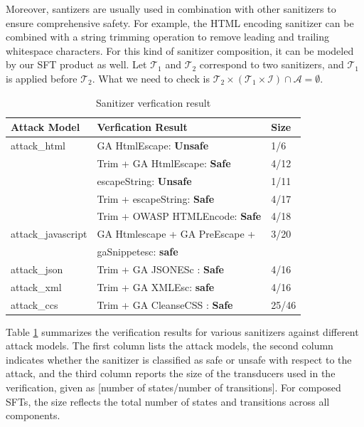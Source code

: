 Moreover, santizers are usually used in combination with other sanitizers to ensure comprehensive safety. For example, the HTML encoding sanitizer can be combined with a string trimming operation to remove leading and trailing whitespace characters. For this kind of sanitizer composition, it can be modeled by our SFT product as well. Let $\mathcal{T}_1$ and $\mathcal{T}_2$ correspond to two sanitizers, and $\mathcal{T}_1$ is applied before $\mathcal{T}_2$. What we need to check is $\mathcal{T}_2 \times (\mathcal{T}_1 \times \mathcal{I}) \cap \mathcal{A} = \emptyset$.




\begin{table}[h]
  \centering
  \small
  \setlength{\tabcolsep}{4pt} %
  \begin{tabular}{p{2.2cm}ll} %
    \toprule
    \textbf{Attack Model} & \textbf{Verfication Result} & \textbf{Size} \\
    \midrule
    attack\_html           & GA HtmlEscape: \textbf{Unsafe} & 1/6\\
                           & Trim + GA HtmlEscape: \textbf{Safe} & 4/12 \\
                           & escapeString: \textbf{Unsafe} & 1/11 \\
                           & Trim + escapeString: \textbf{Safe} & 4/17 \\
                           & Trim + OWASP HTMLEncode: \textbf{Safe} & 4/18 \\
    \midrule
    attack\_javascript     & GA Htmlescape + GA PreEscape + & 3/20 \\
                           &  gaSnippetesc: \textbf{safe} & \\
    \midrule
    attack\_json           & Trim + GA JSONESc : \textbf{Safe} & 4/16\\
    \midrule
    attack\_xml            & Trim + GA XMLEsc: \textbf{safe} & 4/16\\
    \midrule
    attack\_ccs            & Trim + GA CleanseCSS : \textbf{Safe} & 25/46\\
    \bottomrule
  \end{tabular}
  \caption{Sanitizer verfication result}
  \label{tab:sanitizer_attack}
\end{table}

Table \ref{tab:sanitizer_attack} summarizes the verification results for various sanitizers against different attack models. The first column lists the attack models, the second column indicates whether the sanitizer is classified as safe or unsafe with respect to the attack, and the third column reports the size of the transducers used in the verification, given as [number of states/number of transitions]. For composed SFTs, the size reflects the total number of states and transitions across all components.

